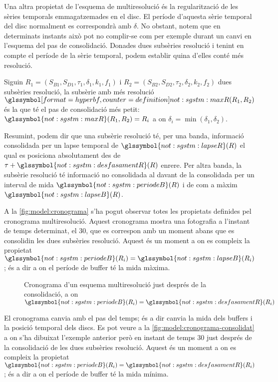 Una altra propietat de l'esquema de multiresolució és la
regularització de les sèries temporals emmagatzemades en el disc. El
període d'aquesta sèrie temporal del disc normalment es correspondrà
amb $\delta$. No obstant, notem que en determinats instants això pot
no complir-se com per exemple durant un canvi en l'esquema del pas de
consolidació. Donades dues subsèries resolució i tenint en compte el
període de la sèrie temporal, podem establir quina d'elles conté més
resolució.
\begin{definition}
  Siguin $R_1=(S_{B1},S_{D1},\tau_1,\delta_1,k_1,f_1)$ i
  $R_2=(S_{B2},S_{D2},\tau_2,\delta_2,k_2,f_2)$ dues subsèries
  resolució, la subsèrie amb més resolució
  $\glssymboldef{not:sgstm:maxR}(R_1,R_2)$ és la que té el pas de
  consolidació més petit: $\glssymbol{not:sgstm:maxR}(R_1,R_2) = R_i$
  a on $\delta_i = \min(\delta_1,\delta_2)$.
\end{definition}



Resumint, podem dir que una subsèrie resolució té, per una
banda, informació consolidada per un lapse temporal de
$\glssymbol{not:sgstm:lapseR}(R)$ el qual es posiciona absolutament des de $\tau +
\glssymbol{not:sgstm:desfasamentR}(R)$ enrere. Per altra banda, la subsèrie resolució
té informació no consolidada al davant de la consolidada per un
interval de mida $\glssymbol{not:sgstm:periodeB}(R)$ i de com a màxim
$\glssymbol{not:sgstm:lapseB}(R)$. 

A la \autoref{fig:model:cronograma} s'ha pogut observar totes les
propietats definides pel cronograma multiresolució. Aquest cronograma
mostra una fotografia a l'instant de temps determinat, el $30$, que es
correspon amb un moment abans que es consolidin les dues subsèries
resolució. Aquest és un moment a on es compleix la
propietat$\glssymbol{not:sgstm:periodeB}(R_i)=\glssymbol{not:sgstm:lapseB}(R_i)$; és a dir a on el
període de buffer té la mida màxima.

\begin{figure}[tp]
  \centering
  
  \caption{Cronograma d'un esquema multiresolució just després de la consolidació, a on $\glssymbol{not:sgstm:periodeB}(R_i)=\glssymbol{not:sgstm:desfasamentR}(R_i)$}
  \label{fig:model:cronograma-consolidat}
\end{figure}

El cronograma canvia amb el pas del temps; és a dir canvia la mida
dels buffers i la posició temporal dels discs. Es pot veure a la
\autoref{fig:model:cronograma-consolidat} a on s'ha dibuixat l'exemple anterior
però en instant de temps $30$ just després de la consolidació de les
dues subsèries resolució. Aquest és un moment a on es compleix la
propietat $\glssymbol{not:sgstm:periodeB}(R_i)=\glssymbol{not:sgstm:desfasamentR}(R_i)$; és a dir a
on el període de buffer té la mida mínima.  


